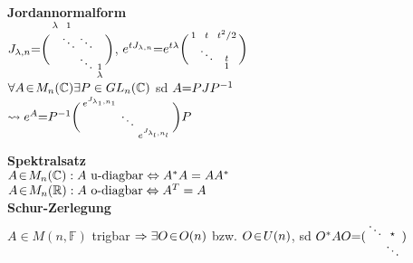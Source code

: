 \documentclass[8pt, a4paper, landscape]{extarticle}
\newcommand{\tit}[1]{\textbf{#1} \\}
\newcommand{\R}{\mathbb{R}}
\newcommand{\C}{\mathbb{C}}
\newcommand{\eq}{\negthickspace=\negthickspace}
\begin{document}
\begin{multicols*}{5}
\begin{ibox}
\tit{Jordannormalform}
$J_{\lambda,n}\eq\bigg(\begin{smallmatrix}
        \lambda & 1 & \, & \, \\
        \, & \ddots & \ddots & \, \\
        \, & \, & \ddots& 1\\
        \, & \, & \,&\lambda \\
    \end{smallmatrix}\bigg)$, $e^{tJ_{\lambda,n}}\eq e^{t\lambda}\bigg(\begin{smallmatrix}
    1 & t & t^2/2 \\
    \, & \ddots & t \\
    \, & \, & 1 \\
    \end{smallmatrix}\bigg)$\\
    $\forall A\negthinspace\in\negthinspace M_n(\C)\exists P\in GL_n(\C)$ sd $A\eq PJP^{-1}$\\
    $\rightsquigarrow e^A\eq P^{-1}\bigg(\begin{smallmatrix}
    e^{J_{\lambda_1,n_1}} & \, & \, \\
    \, & \ddots & \, \\
    \, & \, & e^{J_{\lambda_l,n_l}} \\
    \end{smallmatrix}\bigg)P$
\end{ibox}

\begin{ibox}
\tit{Spektralsatz}
$A\negthinspace\in\negthinspace M_n(\C): A\text{ u-diagbar}\Leftrightarrow A^*A=AA^*$\\
$A\negthinspace\in\negthinspace M_n(\R): A\text{ o-diagbar}\Leftrightarrow A^T=A$\\

\tit{Schur-Zerlegung}
$A\in M(n,\mathbb{F})$ trigbar $\Rightarrow \exists O\negthinspace\in\negthinspace O(n)$ bzw. $O\negthinspace\in\negthinspace U(n)$, sd $O^*AO\eq(\begin{smallmatrix}
    \ddots & \star \\
    \; & \ddots \\
    \end{smallmatrix})$
\end{ibox}


\end{multicols*}
\end{document}

